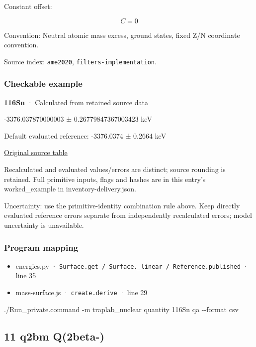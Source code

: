 \documentclass[
  11pt,
  letterpaper,
]{article}
\newenvironment{Shaded}{}{}
\newcommand{\AttributeTok}[1]{\textcolor[rgb]{0.49,0.56,0.16}{#1}}
\newcommand{\ExtensionTok}[1]{#1}
\newcommand{\NormalTok}[1]{#1}
\providecommand{\tightlist}{%
  \setlength{\itemsep}{0pt}\setlength{\parskip}{0pt}}
\begin{document}
Constant offset:

\[
C=0
\]

Convention: Neutral atomic mass excess, ground states, fixed Z/N
coordinate convention.

Source index: \texttt{ame2020}, \texttt{filters-implementation}.

\subsubsection{Checkable example}\label{checkable-example-9}

\textbf{116Sn} · Calculated from retained source data

-3376.037870000003 ± 0.26779847367003423 keV

Default evaluated reference: -3376.0374 ± 0.2664 keV

\href{https://www-nds.iaea.org/amdc/ame2020/rct1.mas20.txt}{Original
source table}

Recalculated and evaluated values/errors are distinct; source rounding
is retained. Full primitive inputs, flags and hashes are in this entry's
worked\_example in inventory-delivery.json.

Uncertainty: use the primitive-identity combination rule above. Keep
directly evaluated reference errors separate from independently
recalculated errors; model uncertainty is unavailable.

\subsubsection{Program mapping}\label{program-mapping-9}

\begin{itemize}
\tightlist
\item
  energies.py ·
  \texttt{Surface.get\ /\ Surface.\_linear\ /\ Reference.published} ·
  line 35
\item
  mass-surface.js · \texttt{create.derive} · line 29
\end{itemize}

\begin{Shaded}
\begin{Highlighting}[]
\ExtensionTok{./Run\_private.command} \AttributeTok{{-}m}\NormalTok{ traplab\_nuclear quantity 116Sn qa }\AttributeTok{{-}{-}format}\NormalTok{ csv}
\end{Highlighting}
\end{Shaded}

\subsection{11 q2bm Q(2beta-)}\label{q2bm-q2beta-}
\end{document}
